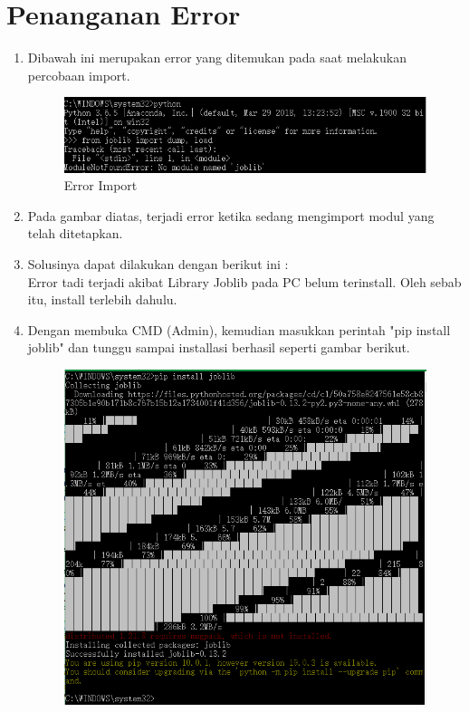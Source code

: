 \section{Penanganan Error}
\begin{enumerate}
\item
Dibawah ini merupakan error yang ditemukan pada saat melakukan percobaan import.
\begin{figure}
\begin{center}
\includegraphics[scale=0.75]{figures/Error1.png}
\caption{Error Import}
\end{center}
\end{figure}
\item
Pada gambar diatas, terjadi error ketika sedang mengimport modul yang telah ditetapkan.
\item
Solusinya dapat dilakukan dengan berikut ini :\\
Error tadi terjadi akibat Library Joblib pada PC belum terinstall. Oleh sebab itu, install terlebih dahulu.
\item
Dengan membuka CMD (Admin), kemudian masukkan perintah "pip install joblib" dan tunggu sampai installasi berhasil seperti gambar berikut.
\begin{figure}
\begin{center}
\includegraphics[scale=0.5]{figures/install2.png}

\end{center}
\end{figure}
\end{enumerate}
